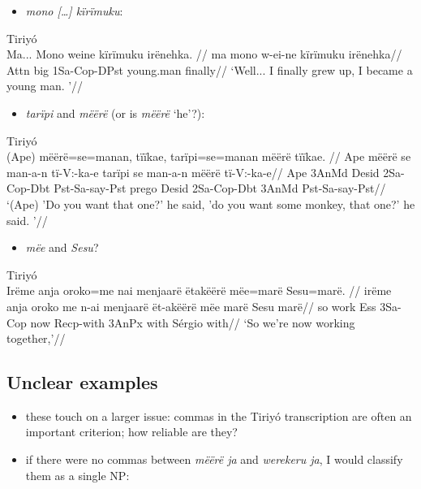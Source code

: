 \documentclass[10pt]{article}
\begin{document}
\begin{itemize}
\tightlist
\item
  \emph{mono {[}\ldots{]} kïrïmuku}:
\end{itemize}

\ex Tiriyó \\
\label{data-01-yakari-01-p-127-022}    \begingl
    \glpreamble Ma... Mono  weine          kïrïmuku  irënehka. //
    \gla ma mono w-ei-ne kïrïmuku irënehka//
    \glb Attn big 1Sa-Cop-DPst young.man finally//
        \glft ‘Well... I finally grew up, I became a young man.  ’//  
    \endgl 
\xe

\begin{itemize}
\tightlist
\item
  \emph{tarïpi} and \emph{mëërë} (or is \emph{mëërë} `he'?):
\end{itemize}

\ex Tiriyó \\
\label{dados-09-kereramake-p-049-392}    \begingl
    \glpreamble (Ape) mëërë=se=manan,           tïïkae,            tarïpi=se=manan            mëërë tïïkae. //
    \gla Ape mëërë se man-a-n tï-V:-ka-e tarïpi se man-a-n mëërë tï-V:-ka-e//
    \glb Ape 3AnMd Desid 2Sa-Cop-Dbt Pst-Sa-say-Pst prego Desid 2Sa-Cop-Dbt 3AnMd Pst-Sa-say-Pst//
        \glft ‘(Ape) 'Do you want that one?' he said, 'do you want some monkey, that one?' he said.  ’//  
    \endgl 
\xe

\begin{itemize}
\tightlist
\item
  \emph{mëe} and \emph{Sesu}?
\end{itemize}

\ex Tiriyó \\
\label{mini-disc-lsmtam13set0001-marciano-little-introduction-004}    \begingl
    \glpreamble Irëme  anja  oroko=me   nai      menjaarë  ëtakëërë      mëe=marë    Sesu=marë. //
    \gla irëme anja oroko me n-ai menjaarë ët-akëërë mëe marë Sesu marë//
    \glb so  work Ess 3Sa-Cop now Recp-with 3AnPx with Sérgio with//
        \glft ‘So we're now working together,’//  
    \endgl 
\xe

\subsection{Unclear examples}

\begin{itemize}
\item
  these touch on a larger issue: commas in the Tiriyó transcription are
  often an important criterion; how reliable are they?
\item
  if there were no commas between \emph{mëërë ja} and \emph{werekeru
  ja}, I would classify them as a single NP:
\end{itemize}
\end{document}
